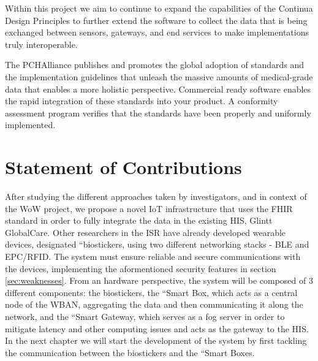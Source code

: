 Within this project we aim to continue to expand the capabilities of the Continua Design Principles to
further extend the software to collect the data that is being exchanged between sensors, gateways,
and end services to make implementations truly interoperable.

The PCHAlliance publishes and promotes the global adoption of standards and the implementation guidelines that unleash the massive amounts of medical-grade data that enables a more holistic perspective. Commercial ready software enables the rapid integration of these standards into your product. A conformity assessment program verifies that the standards have been properly and uniformly implemented.


\section{Statement of Contributions}

After studying the different approaches taken by investigators, and in context of the \acs{WoW} project, we propose a novel \acs{IoT} infrastructure that uses the \acs{FHIR} standard in order to fully integrate the data in the existing \acs{HIS}, Glintt GlobalCare. Other researchers in the \acs{ISR} have already developed wearable devices, designated ``biostickers, using two different networking stacks - BLE and EPC/RFID. The system must ensure reliable and secure communications with the devices, implementing the aformentioned security features in section \ref{sec:weaknesses}. From an hardware perspective, the system will be composed of 3 different components: the biostickers, the ``Smart Box, which acts as a central node of the WBAN, aggregating the data and then communicating it along the network, and the ``Smart Gateway, which serves as a fog server in order to mitigate latency and other computing issues and acts as the gateway to the \acs{HIS}. In the next chapter we will start the development of the system by first tackling the communication between the biostickers and the ``Smart Boxes. 


\bigskip